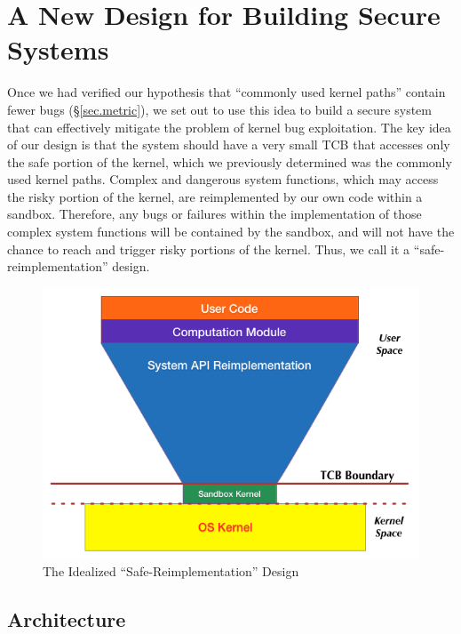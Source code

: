 \section{A New Design for Building Secure Systems}
\label{sec.design}

Once we had verified our hypothesis that ``commonly used kernel paths'' contain fewer bugs (\S{\ref{sec.metric}}), 
we set out to use this idea to build a secure system that can effectively mitigate 
the problem of kernel bug exploitation. The key idea of our design is that the system 
should have a very small TCB that accesses only the safe portion of the kernel, 
which we previously determined was the commonly used kernel paths. 
Complex and dangerous system functions, which may access the risky portion of the kernel, 
are reimplemented by our own code within a sandbox. 
Therefore, any bugs or failures within the implementation of those complex system functions 
will be contained by the sandbox, and will not have the chance to reach 
and trigger risky portions of the kernel. Thus, we call it a ``safe-reimplementation'' design.

\begin{figure}[h]
\centering
\includegraphics[width=1.0\columnwidth]{diagram/lind_secure_design.png}
\caption{The Idealized ``Safe-Reimplementation'' Design}
\label{fig:design}
\end{figure}

\subsection{Architecture}

